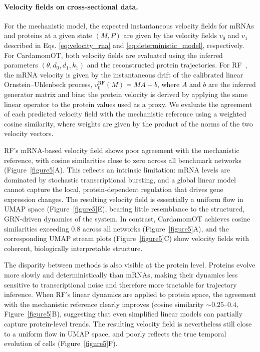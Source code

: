 \documentclass[a4paper, 11pt]{article}
\theoremstyle{plain}
\theoremstyle{remark}
\begin{document}
\paragraph{Velocity fields on cross-sectional data.}
For the mechanistic model, the expected instantaneous velocity fields for mRNAs and
proteins at a given state $(M, P)$ are given by the velocity fields $v_0$ and $v_1$ described in Eqs. \eqref{eq:velocity_rna} and \eqref{eq:deterministic_model}, respectively. For CardamomOT, both velocity fields are evaluated using the inferred parameters
$(\theta, d_0, d_1, k_1)$ and the reconstructed protein trajectories.
For RF~\cite{zhang2024joint}, the mRNA velocity is given by the instantaneous drift
of the calibrated linear Ornstein–Uhlenbeck process,
$v_0^{\mathrm{RF}}(M) = MA + b$,
where $A$ and $b$ are the inferred generator matrix and bias; the protein velocity is
derived by applying the same linear operator to the protein values used as a proxy.
We evaluate the agreement of each predicted velocity field with the mechanistic reference
using a weighted cosine similarity, where weights are given by the product of the norms of the two
velocity vectors.

RF's mRNA-based velocity field shows poor agreement with the mechanistic reference,
with cosine similarities close to zero across all benchmark networks
(Figure~\ref{figure5}A). This reflects an intrinsic limitation: mRNA levels
are dominated by stochastic transcriptional bursting, and a global linear model cannot
capture the local, protein-dependent regulation that drives gene expression changes.
The resulting velocity field is essentially a uniform flow in UMAP space
(Figure~\ref{figure5}E), bearing little resemblance to the structured, GRN-driven dynamics
of the system. In contrast, CardamomOT achieves cosine similarities exceeding $0.8$
across all networks (Figure~\ref{figure5}A), and the corresponding UMAP stream plots
(Figure~\ref{figure5}C) show velocity fields with coherent, biologically interpretable
structure.

The disparity between methods is also visible at the protein level. Proteins evolve
more slowly and deterministically than mRNAs, making their dynamics less sensitive to
transcriptional noise and therefore more tractable for trajectory inference.
When RF's linear dynamics are applied to protein space, the agreement with the mechanistic
reference clearly improves (cosine similarity $\sim 0.25$--$0.4$,
Figure~\ref{figure5}B), suggesting that even simplified linear models can partially capture
protein-level trends. The resulting velocity field is nevertheless still close to a uniform flow in UMAP space, and poorly reflects the true temporal evolution of cells (Figure~\ref{figure5}F). 
\end{document}
